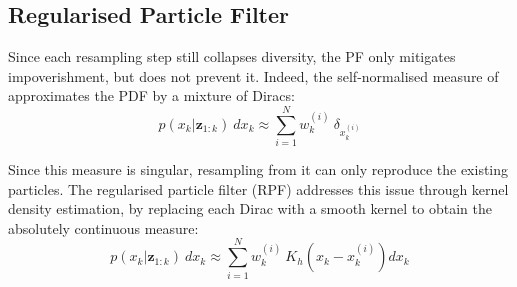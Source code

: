 \begin{algorithm}[H]
	\begin{algorithmic}
	\EndIf
	\end{algorithmic}\caption{Generic Particle Filter}\label{alg:PF}
\end{algorithm}

\subsection{Regularised Particle Filter}

Since each resampling step still collapses diversity, the PF only mitigates impoverishment, but does not prevent it. Indeed, the self-normalised measure of  approximates the PDF by a mixture of Diracs:
\begin{equation}
	p(x_k|\mathbf{z}_{1:k})\:dx_k\approx\sum_{i=1}^Nw_k^{(i)}\:\delta_{x_k^{(i)}}\label{eq:RPF_dirac}
\end{equation}

Since this measure is singular, resampling from it can only reproduce the existing particles. The regularised particle filter (RPF) addresses this issue through kernel density estimation, by replacing each Dirac with a smooth kernel to obtain the absolutely continuous measure:
\begin{equation}
	p(x_k|\mathbf{z}_{1:k})\:dx_k\approx\sum_{i=1}^Nw_k^{(i)}\:K_h\left(x_k-x_k^{(i)}\right)dx_k\label{eq:RPF_kernel}
\end{equation}

